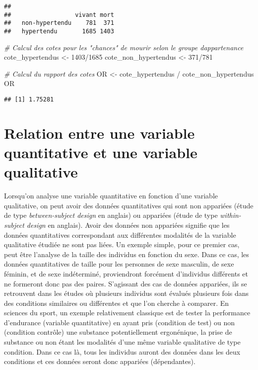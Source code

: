 \documentclass[
]{book}
\newenvironment{Shaded}{\begin{snugshade}}{\end{snugshade}}
\newcommand{\CommentTok}[1]{\textcolor[rgb]{0.56,0.35,0.01}{\textit{#1}}}
\newcommand{\DecValTok}[1]{\textcolor[rgb]{0.00,0.00,0.81}{#1}}
\newcommand{\NormalTok}[1]{#1}
\newcommand{\OtherTok}[1]{\textcolor[rgb]{0.56,0.35,0.01}{#1}}
\newcommand{\SpecialCharTok}[1]{\textcolor[rgb]{0.00,0.00,0.00}{#1}}
\begin{document}
\begin{verbatim}
##                 
##                  vivant mort
##   non-hypertendu    781  371
##   hypertendu       1685 1403
\end{verbatim}

\begin{Shaded}
\begin{Highlighting}[]
\CommentTok{\# Calcul des cotes pour les "chances" de mourir selon le groupe d\textquotesingle{}appartenance}
\NormalTok{cote\_hypertendus }\OtherTok{\textless{}{-}} \DecValTok{1403}\SpecialCharTok{/}\DecValTok{1685}
\NormalTok{cote\_non\_hypertendus }\OtherTok{\textless{}{-}} \DecValTok{371}\SpecialCharTok{/}\DecValTok{781}

\CommentTok{\# Calcul du rapport des cotes}
\NormalTok{OR }\OtherTok{\textless{}{-}}\NormalTok{ cote\_hypertendus }\SpecialCharTok{/}\NormalTok{ cote\_non\_hypertendus}
\NormalTok{OR}
\end{Highlighting}
\end{Shaded}

\begin{verbatim}
## [1] 1.75281
\end{verbatim}

\hypertarget{relation-entre-une-variable-quantitative-et-une-variable-qualitative}{%
\section{Relation entre une variable quantitative et une variable qualitative}\label{relation-entre-une-variable-quantitative-et-une-variable-qualitative}}

Lorsqu'on analyse une variable quantitative en fonction d'une variable qualitative, on peut avoir des données quantitatives qui sont non appariées (étude de type \emph{between-subject design} en anglais) ou appariées (étude de type \emph{within-subject design} en anglais). Avoir des données non appariées signifie que les données quantitatives correspondant aux différentes modalités de la variable qualitative étudiée ne sont pas liées. Un exemple simple, pour ce premier cas, peut être l'analyse de la taille des individus en fonction du sexe. Dans ce cas, les données quantitatives de taille pour les personnes de sexe masculin, de sexe féminin, et de sexe indéterminé, proviendront forcément d'individus différents et ne formeront donc pas des paires. S'agissant des cas de données appariées, ils se retrouvent dans les études où plusieurs individus sont évalués plusieurs fois dans des conditions similaires ou différentes et que l'on cherche à comparer. En sciences du sport, un exemple relativement classique est de tester la performance d'endurance (variable quantitative) en ayant pris (condition de test) ou non (condition contrôle) une substance potentiellement ergonénique, la prise de substance ou non étant les modalités d'une même variable qualitative de type condition. Dans ce cas là, tous les individus auront des données dans les deux conditions et ces données seront donc appariées (dépendantes).
\end{document}
